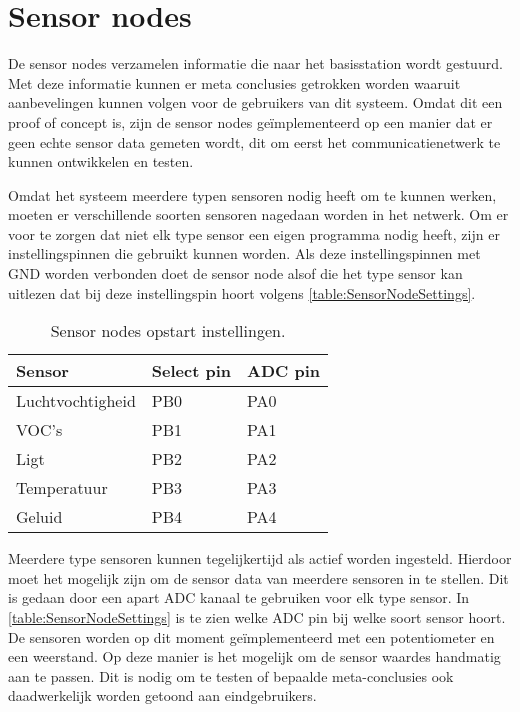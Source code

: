 \section{Sensor nodes} \label{sec:dummyData}

De sensor nodes verzamelen informatie die naar het basisstation wordt gestuurd. Met deze informatie kunnen er meta conclusies getrokken worden waaruit aanbevelingen kunnen volgen voor de gebruikers van dit systeem. Omdat dit een proof of concept is, zijn de sensor nodes geïmplementeerd op een manier dat er geen echte sensor data gemeten wordt, dit om eerst het communicatienetwerk te kunnen ontwikkelen en testen. 

Omdat het systeem meerdere typen sensoren nodig heeft om te kunnen werken, moeten er verschillende soorten sensoren nagedaan worden in het netwerk. Om er voor te zorgen dat niet elk type sensor een eigen programma nodig heeft, zijn er instellingspinnen die gebruikt kunnen worden.
Als deze instellingspinnen met GND worden verbonden doet de sensor node alsof die het type sensor kan uitlezen dat bij deze instellingspin hoort volgens \autoref{table:SensorNodeSettings}.
\begin{table}[h]
    \centering
    \begin{tabular}{l|l|l}      
        \textbf{Sensor}     & \textbf{Select pin}   & \textbf{ADC pin}  \\\hline
        Luchtvochtigheid    & PB0                   & PA0               \\\hline
        VOC's               & PB1                   & PA1               \\\hline
        Ligt                & PB2                   & PA2               \\\hline
        Temperatuur         & PB3                   & PA3               \\\hline
        Geluid              & PB4                   & PA4
    \end{tabular}
    \caption{Sensor nodes opstart instellingen.}
    \label{table:SensorNodeSettings}
\end{table}
Meerdere type sensoren kunnen tegelijkertijd als actief worden ingesteld. Hierdoor moet het mogelijk zijn om de sensor data van meerdere sensoren in te stellen. Dit is gedaan door een apart ADC kanaal te gebruiken voor elk type sensor. In \autoref{table:SensorNodeSettings} is te zien welke ADC pin bij welke soort sensor hoort. De sensoren worden op dit moment geïmplementeerd met een potentiometer en een weerstand. Op deze manier is het mogelijk om de sensor waardes handmatig aan te passen. Dit is nodig om te testen of bepaalde meta-conclusies ook daadwerkelijk worden getoond aan eindgebruikers.


